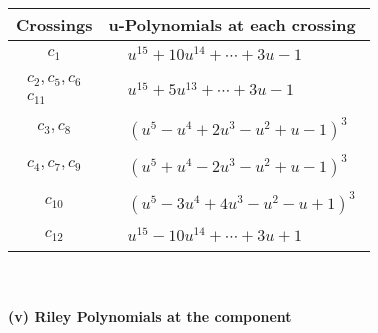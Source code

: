 \documentclass[1p]{elsarticle_modified}
\theoremstyle{definition}
\begin{document}
\begin{tabular}{m{50pt}|m{274pt}}
Crossings & \hspace{64pt}u-Polynomials at each crossing \\
\hline $$\begin{aligned}c_{1}\end{aligned}$$&$\begin{aligned}
&u^{15}+10 u^{14}+\cdots+3 u-1
\end{aligned}$\\
\hline $$\begin{aligned}c_{2},c_{5},c_{6}\\c_{11}\end{aligned}$$&$\begin{aligned}
&u^{15}+5 u^{13}+\cdots+3 u-1
\end{aligned}$\\
\hline $$\begin{aligned}c_{3},c_{8}\end{aligned}$$&$\begin{aligned}
&(u^5- u^4+2 u^3- u^2+u-1)^3
\end{aligned}$\\
\hline $$\begin{aligned}c_{4},c_{7},c_{9}\end{aligned}$$&$\begin{aligned}
&(u^5+u^4-2 u^3- u^2+u-1)^3
\end{aligned}$\\
\hline $$\begin{aligned}c_{10}\end{aligned}$$&$\begin{aligned}
&(u^5-3 u^4+4 u^3- u^2- u+1)^3
\end{aligned}$\\
\hline $$\begin{aligned}c_{12}\end{aligned}$$&$\begin{aligned}
&u^{15}-10 u^{14}+\cdots+3 u+1
\end{aligned}$\\
\hline
\end{tabular}\\~\\
\newpage\renewcommand{\arraystretch}{1}
\flushleft \textbf{(v) Riley Polynomials at the component}\newline \\
\end{document}
